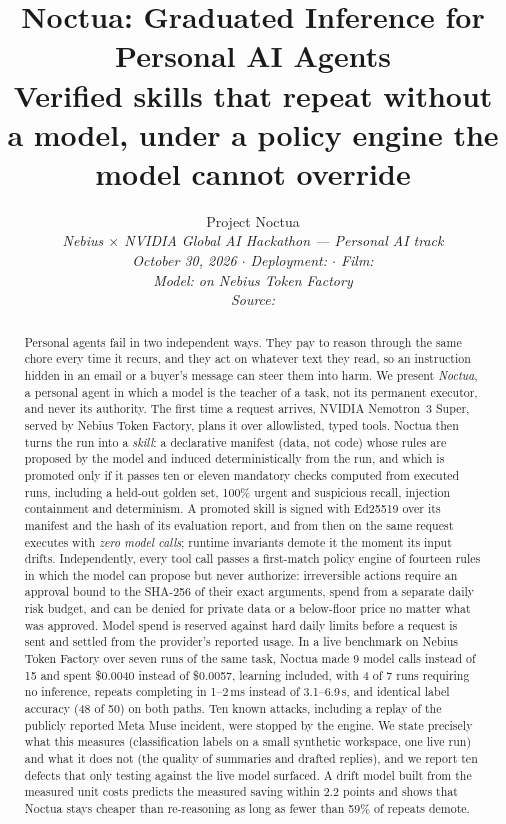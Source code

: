 \documentclass[11pt]{article}
\title{\textbf{Noctua: Graduated Inference for Personal AI Agents}\\[4pt]
\large Verified skills that repeat without a model, under a policy engine the model cannot override}
\author{Project Noctua\\[2pt]
\small\itshape Nebius $\times$ NVIDIA Global AI Hackathon --- Personal AI track\\
\footnotesize October 30, 2026 \;$\cdot$\; Deployment: \code{noctua-gkbv.onrender.com} \;$\cdot$\; Film: \code{youtu.be/MitssZU897o}\\
\footnotesize Model: \code{nvidia/nemotron-3-super-120b-a12b} on Nebius Token Factory\\
\footnotesize Source: \code{github.com/Aaditya1273/Noctua}}
\date{}
\begin{document}
\maketitle

\begin{abstract}
\noindent
Personal agents fail in two independent ways. They pay to reason through the same chore every time it recurs, and
they act on whatever text they read, so an instruction hidden in an email or a buyer's message can steer them into
harm. We present \emph{Noctua}, a personal agent in which a model is the teacher of a task, not its permanent
executor, and never its authority. The first time a request arrives, NVIDIA Nemotron~3 Super, served by Nebius Token
Factory, plans it over allowlisted, typed tools. Noctua then turns the run into a \emph{skill}: a declarative manifest
(data, not code) whose rules are proposed by the model and induced deterministically from the run, and which is
promoted only if it passes ten or eleven mandatory checks computed from executed runs, including a held-out golden
set, 100\% urgent and suspicious recall, injection containment and determinism. A promoted skill is signed with
Ed25519 over its manifest and the hash of its evaluation report, and from then on the same request executes with
\emph{zero model calls}; runtime invariants demote it the moment its input drifts. Independently, every tool call
passes a first-match policy engine of fourteen rules in which the model can propose but never authorize: irreversible
actions require an approval bound to the SHA-256 of their exact arguments, spend from a separate daily risk budget,
and can be denied for private data or a below-floor price no matter what was approved. Model spend is reserved
against hard daily limits before a request is sent and settled from the provider's reported usage. In a live
benchmark on Nebius Token Factory over seven runs of the same task, Noctua made 9 model calls instead of 15 and spent
\$0.0040 instead of \$0.0057, learning included, with 4 of 7 runs requiring no inference, repeats completing in
1--2\,ms instead of 3.1--6.9\,s, and identical label accuracy (48 of 50) on both paths. Ten known attacks, including
a replay of the publicly reported Meta Muse incident, were stopped by the engine. We state precisely what this
measures (classification labels on a small synthetic workspace, one live run) and what it does not (the quality of
summaries and drafted replies), and we report ten defects that only testing against the live model surfaced. A drift model built from the measured
unit costs predicts the measured saving within 2.2 points and shows that Noctua stays cheaper than re-reasoning as
long as fewer than 59\% of repeats demote.
\end{abstract}
\end{document}
